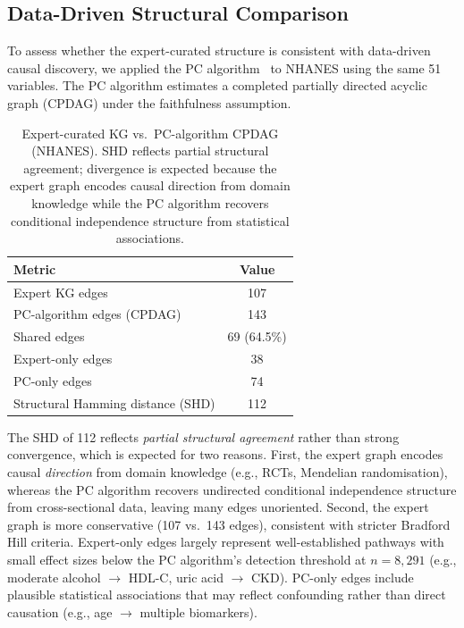 \documentclass[runningheads]{llncs}
\begin{document}
\subsection{Data-Driven Structural Comparison}\label{sec:pcalg}

To assess whether the expert-curated structure is consistent with
data-driven causal discovery, we applied the PC
algorithm~\cite{spirtes2000causation} to NHANES using the same 51
variables.  The PC algorithm estimates a completed partially directed
acyclic graph (CPDAG) under the faithfulness assumption.

\begin{table}[t]
\centering
\caption{Expert-curated KG vs.\ PC-algorithm CPDAG (NHANES).
SHD reflects partial structural agreement; divergence is expected
because the expert graph encodes causal direction from domain
knowledge while the PC algorithm recovers conditional independence
structure from statistical associations.}\label{tab:pcalg}
\small
\begin{tabular}{@{}lc@{}}
\toprule
\textbf{Metric} & \textbf{Value} \\
\midrule
Expert KG edges                     & 107 \\
PC-algorithm edges (CPDAG)          & 143 \\
Shared edges                        & 69 (64.5\%) \\
Expert-only edges                   & 38 \\
PC-only edges                       & 74 \\
Structural Hamming distance (SHD)   & 112 \\
\bottomrule
\end{tabular}
\end{table}

The SHD of 112 reflects \emph{partial structural agreement} rather
than strong convergence, which is expected for two reasons.  First,
the expert graph encodes causal \emph{direction} from domain knowledge
(e.g., RCTs, Mendelian randomisation), whereas the PC algorithm
recovers undirected conditional independence structure from
cross-sectional data, leaving many edges unoriented.  Second, the
expert graph is more conservative (107 vs.\ 143 edges), consistent
with stricter Bradford Hill criteria.  Expert-only edges largely
represent well-established pathways with small effect sizes below the
PC algorithm's detection threshold at $n = 8{,}291$ (e.g., moderate
alcohol $\rightarrow$ HDL-C, uric acid $\rightarrow$ CKD).  PC-only
edges include plausible statistical associations that may reflect
confounding rather than direct causation (e.g., age $\rightarrow$
multiple biomarkers).
\end{document}
